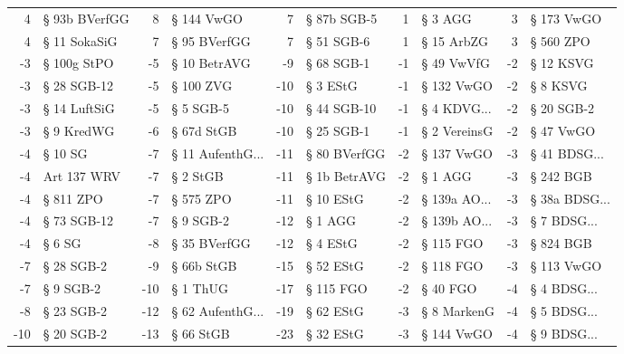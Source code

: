\begin{tabular}{rlrlrlrlrl}
        4 &       § 93b BVerfGG &         8 &         § 144 VwGO &         7 &   § 87b SGB-5 &         1 &        § 3 AGG &         3 &      § 173 VwGO \\
        4 &        § 11 SokaSiG &         7 &       § 95 BVerfGG &         7 &    § 51 SGB-6 &         1 &     § 15 ArbZG &         3 &       § 560 ZPO \\
       -3 &         § 100g StPO &        -5 &       § 10 BetrAVG &        -9 &    § 68 SGB-1 &        -1 &     § 49 VwVfG &        -2 &       § 12 KSVG \\
       -3 &         § 28 SGB-12 &        -5 &          § 100 ZVG &       -10 &      § 3 EStG &        -1 &     § 132 VwGO &        -2 &        § 8 KSVG \\
       -3 &        § 14 LuftSiG &        -5 &          § 5 SGB-5 &       -10 &   § 44 SGB-10 &        -1 &  § 4 KDVG... &        -2 &      § 20 SGB-2 \\
       -3 &          § 9 KredWG &        -6 &         § 67d StGB &       -10 &    § 25 SGB-1 &        -1 &   § 2 VereinsG &        -2 &       § 47 VwGO \\
       -4 &             § 10 SG &        -7 & § 11 AufenthG... &       -11 &  § 80 BVerfGG &        -2 &     § 137 VwGO &        -3 &  § 41 BDSG... \\
       -4 &         Art 137 WRV &        -7 &           § 2 StGB &       -11 &  § 1b BetrAVG &        -2 &        § 1 AGG &        -3 &       § 242 BGB \\
       -4 &           § 811 ZPO &        -7 &          § 575 ZPO &       -11 &     § 10 EStG &        -2 & § 139a AO... &        -3 & § 38a BDSG... \\
       -4 &         § 73 SGB-12 &        -7 &          § 9 SGB-2 &       -12 &       § 1 AGG &        -2 & § 139b AO... &        -3 &   § 7 BDSG... \\
       -4 &              § 6 SG &        -8 &       § 35 BVerfGG &       -12 &      § 4 EStG &        -2 &      § 115 FGO &        -3 &       § 824 BGB \\
       -7 &          § 28 SGB-2 &        -9 &         § 66b StGB &       -15 &     § 52 EStG &        -2 &      § 118 FGO &        -3 &      § 113 VwGO \\
       -7 &           § 9 SGB-2 &       -10 &           § 1 ThUG &       -17 &     § 115 FGO &        -2 &       § 40 FGO &        -4 &   § 4 BDSG... \\
       -8 &          § 23 SGB-2 &       -12 & § 62 AufenthG... &       -19 &     § 62 EStG &        -3 &    § 8 MarkenG &        -4 &   § 5 BDSG... \\
      -10 &          § 20 SGB-2 &       -13 &          § 66 StGB &       -23 &     § 32 EStG &        -3 &     § 144 VwGO &        -4 &   § 9 BDSG... \\
\bottomrule
\end{tabular}

